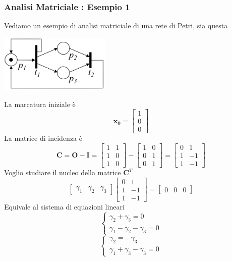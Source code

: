 \documentclass[10pt, letterpaper]{report}
\begin{document}
\subsubsection{Analisi Matriciale : Esempio 1} 
Vediamo un esempio di analisi matriciale di una rete di Petri, sia questa
\begin{center}
    \includegraphics[width=0.4\textwidth]{images/petriMatrix.pdf}
\end{center}
La marcatura iniziale è $$\mathbf{x_0}=\begin{bmatrix}
    1\\ 0\\ 0
\end{bmatrix}$$ 
La matrice di incidenza è 
$$ \mathbf C = \mathbf O - \mathbf I =\begin{bmatrix}
    1 & 1 \\ 
    1 & 0 \\ 
    1 & 0
\end{bmatrix}-\begin{bmatrix}
    1 & 0 \\ 
    0 & 1 \\ 
    0 & 1
\end{bmatrix}=\begin{bmatrix}
    0 & 1 \\ 
    1 & -1 \\ 
    1 & -1
\end{bmatrix}
$$
Voglio studiare il nucleo della matrice $\mathbf C^T$
$$\begin{bmatrix}
    \gamma_1 & \gamma_2 & \gamma_3
\end{bmatrix} \begin{bmatrix}
    0 & 1 \\ 
    1 & -1 \\ 
    1 & -1
\end{bmatrix}=\begin{bmatrix}
    0 & 0 & 0
\end{bmatrix}$$
Equivale al sistema di equazioni lineari 
$$ 
\begin{cases}
    \gamma_2+\gamma_3=0\\ 
    \gamma_1-\gamma_2-\gamma_3=0
\end{cases}
$$
$$ 
\begin{cases}
    \gamma_2=-\gamma_3\\ 
    \gamma_1+\gamma_3-\gamma_3=0
\end{cases}
$$
\end{document}
